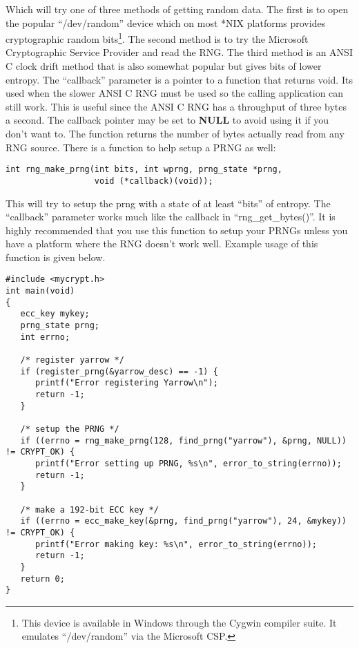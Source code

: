 \documentclass{book}
\begin{document}
Which will try one of three methods of getting random data.  The first is to open the popular ``/dev/random'' device which 
on most *NIX platforms provides cryptographic random bits\footnote{This device is available in Windows through the Cygwin compiler suite.  It emulates ``/dev/random'' via the Microsoft CSP.}.  
The second method is to try the Microsoft Cryptographic Service Provider and read the RNG.  The third method is an ANSI C 
clock drift method that is also somewhat popular but gives bits of lower entropy.  The ``callback'' parameter is a pointer to a function that returns void.  Its used when the slower ANSI C RNG must be 
used so the calling application can still work.  This is useful since the ANSI C RNG has a throughput of three 
bytes a second.  The callback pointer may be set to {\bf NULL} to avoid using it if you don't want to.  The function 
returns the number of bytes actually read from any RNG source.  There is a function to help setup a PRNG as well:
\begin{verbatim}
int rng_make_prng(int bits, int wprng, prng_state *prng, 
                  void (*callback)(void));
\end{verbatim}
This will try to setup the prng with a state of at least ``bits'' of entropy.  The ``callback'' parameter works much like
the callback in ``rng\_get\_bytes()''.  It is highly recommended that you use this function to setup your PRNGs unless you have a
platform where the RNG doesn't work well.  Example usage of this function is given below.

\begin{small}
\begin{verbatim}
#include <mycrypt.h>
int main(void)
{
   ecc_key mykey;
   prng_state prng;
   int errno;

   /* register yarrow */
   if (register_prng(&yarrow_desc) == -1) {
      printf("Error registering Yarrow\n");
      return -1;
   }

   /* setup the PRNG */
   if ((errno = rng_make_prng(128, find_prng("yarrow"), &prng, NULL)) != CRYPT_OK) {
      printf("Error setting up PRNG, %s\n", error_to_string(errno));
      return -1;
   }

   /* make a 192-bit ECC key */
   if ((errno = ecc_make_key(&prng, find_prng("yarrow"), 24, &mykey)) != CRYPT_OK) {
      printf("Error making key: %s\n", error_to_string(errno));
      return -1;
   }
   return 0;
}
\end{verbatim}
\end{small}
\end{document}
